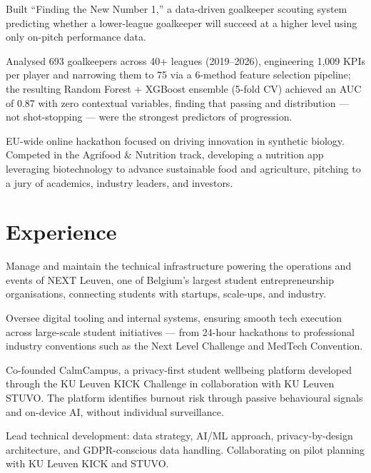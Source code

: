 \begin{bullets}
    \item Built ``Finding the New Number 1,'' a data-driven goalkeeper scouting system predicting whether a lower-league goalkeeper will succeed at a higher level using only on-pitch performance data.
    \item Analysed 693 goalkeepers across 40+ leagues (2019--2026), engineering 1,009 KPIs per player and narrowing them to 75 via a 6-method feature selection pipeline; the resulting Random Forest + XGBoost ensemble (5-fold CV) achieved an AUC of 0.87 with zero contextual variables, finding that passing and distribution --- not shot-stopping --- were the strongest predictors of progression.
\end{bullets}

\begin{bullets}
    \item EU-wide online hackathon focused on driving innovation in synthetic biology. Competed in the Agrifood \& Nutrition track, developing a nutrition app leveraging biotechnology to advance sustainable food and agriculture, pitching to a jury of academics, industry leaders, and investors.
\end{bullets}


\section{Experience}

\begin{bullets}
    \item Manage and maintain the technical infrastructure powering the operations and events of NEXT Leuven, one of Belgium's largest student entrepreneurship organisations, connecting students with startups, scale-ups, and industry.
    \item Oversee digital tooling and internal systems, ensuring smooth tech execution across large-scale student initiatives --- from 24-hour hackathons to professional industry conventions such as the Next Level Challenge and MedTech Convention.
\end{bullets}

\begin{bullets}
    \item Co-founded CalmCampus, a privacy-first student wellbeing platform developed through the KU Leuven KICK Challenge in collaboration with KU Leuven STUVO. The platform identifies burnout risk through passive behavioural signals and on-device AI, without individual surveillance.
    \item Lead technical development: data strategy, AI/ML approach, privacy-by-design architecture, and GDPR-conscious data handling. Collaborating on pilot planning with KU Leuven KICK and STUVO.
\end{bullets}

